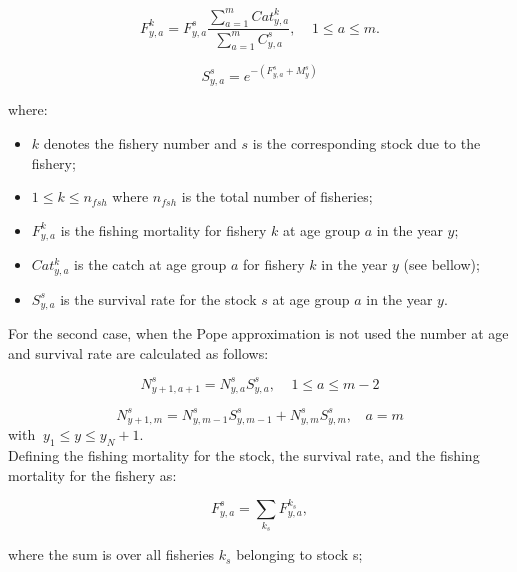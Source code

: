 \documentclass{article}
\begin{document}
\begin{equation}
F^k_{y,a}=F^s_{y,a}\dfrac{\sum_{a = 1} ^{m} Cat^k_{y,a}}{\sum_{a=1} ^{m} C^s_{y,a}}, \ \ \ \ \ 1\leq a \leq m.
\end{equation}

\begin{equation}
S^s_{y,a}=e^{-(F^s_{y,a}+M^s_{y})}
\end{equation}

where:
\begin{itemize}
    \item $k$ denotes the fishery number and $s$ is the corresponding stock due to the fishery;
    
    \item $1\leq k \leq n_{fsh}$ where $n_{fsh}$ is the total number of fisheries;
   
    \item $F^k_{y,a}$ is the fishing mortality for fishery $k$ at age group $a$ in the year $y$;

    \item $Cat^k_{y,a}$ is the catch at age group $a$ for fishery $k$ in the year $y$ (see bellow);
    
    \item $S^s_{y,a}$ is the survival rate for the stock $s$ at age group $a$ in the year $y$.
\end{itemize}

\hfill

For the second case, when the Pope approximation is not used the number at age and survival rate are calculated as follows:

\begin{equation}
N^s_{y+1,a+1}=N^s_{y,a}S^s_{y,a}, \ \ \ \ \ 1\leq a \leq m-2
\end{equation}

\begin{equation}
N^s_{y+1,m}=N^s_{y,m-1}S^s_{y,m-1}+N^s_{y,m}S^s_{y,m}, \ \ \ \ a = m
\end{equation}
with $\ y_1\leq y \leq y_N+1$.\\

Defining the fishing mortality for the stock, the survival rate, and the fishing mortality for the fishery as:

\begin{equation}
F^s_{y,a} = \sum_{k_s}F^{k_s}_{y,a}, 
\end{equation}

where the sum is over all fisheries $k_s$ belonging to stock s;
\end{document}
